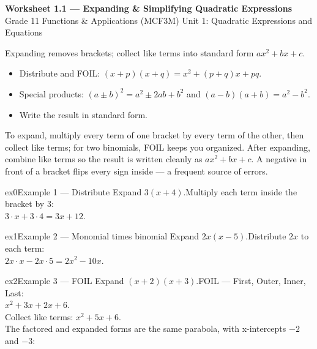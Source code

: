 \documentclass[11pt]{article}
\begin{document}
\begin{center}
{\LARGE\bfseries\color{titleblue}Worksheet 1.1 --- Expanding \& Simplifying Quadratic Expressions}\\[2pt]
{\small Grade 11 Functions \& Applications (MCF3M) \textperiodcentered{} Unit 1: Quadratic Expressions and Equations}
\end{center}

\begin{ideabox}
Expanding removes brackets; collect like terms into standard form $ax^2+bx+c$.
\begin{itemize}[leftmargin=*,itemsep=2pt]
  \item Distribute and FOIL: $(x+p)(x+q)=x^2+(p+q)x+pq$.
  \item Special products: $(a\pm b)^2=a^2\pm2ab+b^2$ and $(a-b)(a+b)=a^2-b^2$.
  \item Write the result in standard form.
\end{itemize}
\end{ideabox}

\begin{learnbox}
To expand, multiply every term of one bracket by every term of the other, then collect like terms; for two binomials, FOIL keeps you organized.
After expanding, combine like terms so the result is written cleanly as $ax^2+bx+c$.
A negative in front of a bracket flips every sign inside — a frequent source of errors.
\end{learnbox}


\begin{example}{ex0}{Example 1 --- Distribute}
Expand $3(x+4)$.\soln Multiply each term inside the bracket by $3$: \\ $3\cdot x+3\cdot4=3x+12$.
\end{example}

\begin{example}{ex1}{Example 2 --- Monomial times binomial}
Expand $2x(x-5)$.\soln Distribute $2x$ to each term: \\ $2x\cdot x-2x\cdot5=2x^2-10x$.
\end{example}

\begin{example}{ex2}{Example 3 --- FOIL}
Expand $(x+2)(x+3)$.\soln FOIL — First, Outer, Inner, Last: \\ $x^2+3x+2x+6$. \\ Collect like terms: $x^2+5x+6$. \\ The factored and expanded forms are the same parabola, with x-intercepts $-2$ and $-3$:
\end{example}
\end{document}
